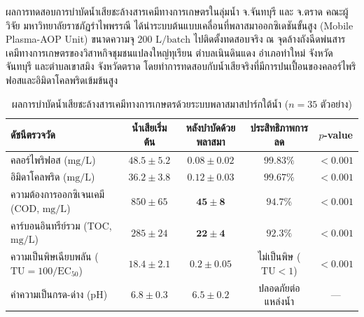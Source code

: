 \begin{agribox}{ผลการทดสอบการบำบัดน้ำเสียชะล้างสารเคมีทางการเกษตรในลุ่มน้ำ จ.จันทบุรี และ จ.ตราด}
คณะผู้วิจัย มหาวิทยาลัยราชภัฏรำไพพรรณี ได้นำระบบต้นแบบเคลื่อนที่พลาสมาออกซิเดชันขั้นสูง (Mobile Plasma-AOP Unit) ขนาดความจุ $200 \text{ L/batch}$ ไปติดตั้งทดสอบจริง ณ จุดล้างถังฉีดพ่นสารเคมีทางการเกษตรของวิสาหกิจชุมชนแปลงใหญ่ทุเรียน ตำบลเนินดินแดง อำเภอท่าใหม่ จังหวัดจันทบุรี และตำบลเขาสมิง จังหวัดตราด โดยทำการทดสอบกับน้ำเสียจริงที่มีการปนเปื้อนของคลอร์ไพริฟอสและอิมิดาโคลพริดเข้มข้นสูง

\begin{table}[H]
\centering
\small
\caption{ผลการบำบัดน้ำเสียชะล้างสารเคมีทางการเกษตรด้วยระบบพลาสมาสปาร์กใต้น้ำ ($n = 35$ ตัวอย่าง)}
\label{tab:ch08_water_results}
\begin{tabular}{lcccc}
\toprule
\textbf{ดัชนีตรวจวัด} & \textbf{น้ำเสียเริ่มต้น} & \textbf{หลังบำบัดด้วยพลาสมา} & \textbf{ประสิทธิภาพการลด} & \textbf{$p$-value} \\
\midrule
คลอร์ไพริฟอส ($\text{mg/L}$) & $48.5 \pm 5.2$ & $\mathbf{0.08 \pm 0.02}$ & $\mathbf{99.83\%}$ & $<0.001$ \\
อิมิดาโคลพริด ($\text{mg/L}$) & $36.2 \pm 3.8$ & $\mathbf{0.12 \pm 0.03}$ & $\mathbf{99.67\%}$ & $<0.001$ \\
ความต้องการออกซิเจนเคมี (COD, $\text{mg/L}$) & $850 \pm 65$ & $\mathbf{45 \pm 8}$ & $\mathbf{94.7\%}$ & $<0.001$ \\
คาร์บอนอินทรีย์รวม (TOC, $\text{mg/L}$) & $285 \pm 24$ & $\mathbf{22 \pm 4}$ & $\mathbf{92.3\%}$ & $<0.001$ \\
ความเป็นพิษเฉียบพลัน ($\text{TU} = 100/\text{EC}_{50}$) & $18.4 \pm 2.1$ & $\mathbf{0.2 \pm 0.05}$ & ไม่เป็นพิษ ($\text{TU} < 1$) & $<0.001$ \\
ค่าความเป็นกรด-ด่าง (pH) & $6.8 \pm 0.3$ & $\mathbf{6.5 \pm 0.2}$ & ปลอดภัยต่อแหล่งน้ำ & --- \\
\bottomrule
\end{tabular}
\end{table}


\end{agribox}
